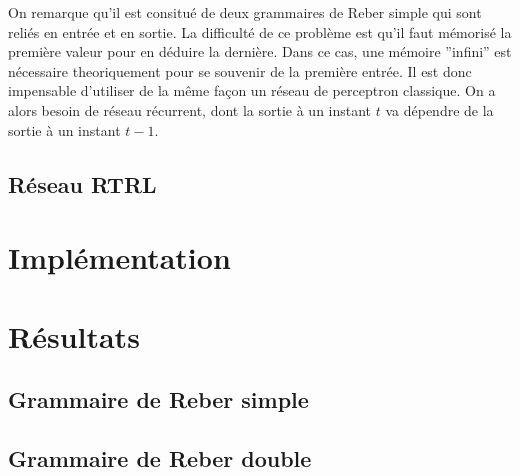 On remarque qu'il est consitué de deux grammaires de Reber simple qui sont reliés en entrée et en sortie. La difficulté de ce problème est qu'il faut mémorisé la première valeur pour en déduire la dernière. Dans ce cas, une mémoire ''infini'' est nécessaire theoriquement pour se souvenir de la première entrée. Il est donc impensable d'utiliser de la même façon un réseau de perceptron classique. On a alors besoin de réseau récurrent, dont la sortie à un instant $t$ va dépendre de la sortie à un instant $t-1$.

\subsection{Réseau RTRL}

\section{Implémentation}

\section{Résultats}
\subsection{Grammaire de Reber simple}
\subsection{Grammaire de Reber double}
